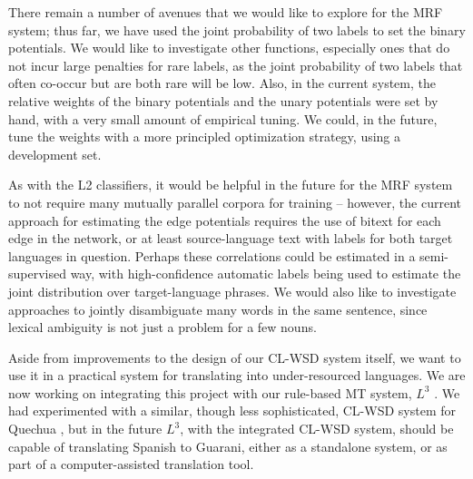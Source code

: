 \documentclass[11pt,letterpaper]{article}
\begin{document}
There remain a number of avenues that we would like to explore for the MRF
system; thus far, we have used the joint probability of two labels to set the
binary potentials. We would like to investigate other functions, especially
ones that do not incur large penalties for rare labels, as the joint
probability of two labels that often co-occur but are both rare will be low.
Also, in the current system, the relative weights of the binary potentials and
the unary potentials were set by hand, with a very small amount of empirical
tuning. We could, in the future, tune the weights with a more principled
optimization strategy, using a development set.

As with the L2 classifiers, it would be helpful in the future for the
MRF system to not require many mutually parallel corpora for training --
however, the current approach for estimating the edge potentials requires the
use of bitext for each edge in the network, or at least source-language text
with labels for both target languages in question. Perhaps these correlations
could be estimated in a semi-supervised way, with high-confidence automatic
labels being used to estimate the joint distribution over target-language
phrases.  We would also like to investigate approaches to jointly disambiguate
many words in the same sentence, since lexical ambiguity is not just a problem
for a few nouns.

Aside from improvements to the design of our CL-WSD system itself, we want to
use it in a practical system for translating into under-resourced languages.
We are now working on integrating this project with our rule-based MT system,
$L^3$ \cite{gasser:aflat2012}. We had experimented with a similar, though less
sophisticated, CL-WSD system for Quechua \cite{rudnick:2011:RANLPStud}, but in
the future $L^3$, with the integrated CL-WSD system, should be capable of
translating Spanish to Guarani, either as a standalone system, or as part of a
computer-assisted translation tool.



{}
\end{document}
